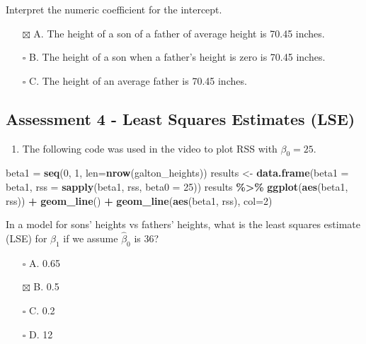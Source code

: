 \documentclass[
]{article}
\newenvironment{Shaded}{\begin{snugshade}}{\end{snugshade}}
\newcommand{\DataTypeTok}[1]{\textcolor[rgb]{0.13,0.29,0.53}{#1}}
\newcommand{\DecValTok}[1]{\textcolor[rgb]{0.00,0.00,0.81}{#1}}
\newcommand{\KeywordTok}[1]{\textcolor[rgb]{0.13,0.29,0.53}{\textbf{#1}}}
\newcommand{\NormalTok}[1]{#1}
\newcommand{\OperatorTok}[1]{\textcolor[rgb]{0.81,0.36,0.00}{\textbf{#1}}}
\newcommand{\StringTok}[1]{\textcolor[rgb]{0.31,0.60,0.02}{#1}}
\providecommand{\tightlist}{%
  \setlength{\itemsep}{0pt}\setlength{\parskip}{0pt}}
\begin{document}
Interpret the numeric coefficient for the intercept.

\begin{itemize}
\tightlist
\item[$\boxtimes$]
  A. The height of a son of a father of average height is 70.45 inches.
\item[$\square$]
  B. The height of a son when a father's height is zero is 70.45 inches.
\item[$\square$]
  C. The height of an average father is 70.45 inches.
\end{itemize}

\hypertarget{assessment-4---least-squares-estimates-lse}{%
\subsection{Assessment 4 - Least Squares Estimates
(LSE)}\label{assessment-4---least-squares-estimates-lse}}

\begin{enumerate}
\def\labelenumi{\arabic{enumi}.}
\tightlist
\item
  The following code was used in the video to plot RSS with
  \(\beta_0=25\).
\end{enumerate}

\begin{Shaded}
\begin{Highlighting}[]
\NormalTok{beta1 =}\StringTok{ }\KeywordTok{seq}\NormalTok{(}\DecValTok{0}\NormalTok{, }\DecValTok{1}\NormalTok{, }\DataTypeTok{len=}\KeywordTok{nrow}\NormalTok{(galton\_heights))}
\NormalTok{results \textless{}{-}}\StringTok{ }\KeywordTok{data.frame}\NormalTok{(}\DataTypeTok{beta1 =}\NormalTok{ beta1,}
                      \DataTypeTok{rss =} \KeywordTok{sapply}\NormalTok{(beta1, rss, }\DataTypeTok{beta0 =} \DecValTok{25}\NormalTok{))}
\NormalTok{results }\OperatorTok{\%\textgreater{}\%}\StringTok{ }\KeywordTok{ggplot}\NormalTok{(}\KeywordTok{aes}\NormalTok{(beta1, rss)) }\OperatorTok{+}\StringTok{ }\KeywordTok{geom\_line}\NormalTok{() }\OperatorTok{+}\StringTok{ }
\StringTok{  }\KeywordTok{geom\_line}\NormalTok{(}\KeywordTok{aes}\NormalTok{(beta1, rss), }\DataTypeTok{col=}\DecValTok{2}\NormalTok{)}
\end{Highlighting}
\end{Shaded}

In a model for sons' heights vs fathers' heights, what is the least
squares estimate (LSE) for \(\beta_1\) if we assume \(\hat{\beta}_{0}\)
is 36?

\begin{itemize}
\tightlist
\item[$\square$]
  A. 0.65
\item[$\boxtimes$]
  B. 0.5
\item[$\square$]
  C. 0.2
\item[$\square$]
  D. 12
\end{itemize}
\end{document}
